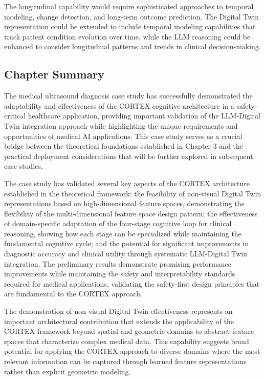 The longitudinal capability would require sophisticated approaches to temporal modeling, change detection, and long-term outcome prediction. The Digital Twin representation could be extended to include temporal modeling capabilities that track patient condition evolution over time, while the LLM reasoning could be enhanced to consider longitudinal patterns and trends in clinical decision-making.

\subsection{Chapter Summary}

The medical ultrasound diagnosis case study has successfully demonstrated the adaptability and effectiveness of the CORTEX cognitive architecture in a safety-critical healthcare application, providing important validation of the LLM-Digital Twin integration approach while highlighting the unique requirements and opportunities of medical AI applications. This case study serves as a crucial bridge between the theoretical foundations established in Chapter 3 and the practical deployment considerations that will be further explored in subsequent case studies.

The case study has validated several key aspects of the CORTEX architecture established in the theoretical framework: the feasibility of non-visual Digital Twin representations based on high-dimensional feature spaces, demonstrating the flexibility of the multi-dimensional feature space design pattern; the effectiveness of domain-specific adaptation of the four-stage cognitive loop for clinical reasoning, showing how each stage can be specialized while maintaining the fundamental cognitive cycle; and the potential for significant improvements in diagnostic accuracy and clinical utility through systematic LLM-Digital Twin integration. The preliminary results demonstrate promising performance improvements while maintaining the safety and interpretability standards required for medical applications, validating the safety-first design principles that are fundamental to the CORTEX approach.

The demonstration of non-visual Digital Twin effectiveness represents an important architectural contribution that extends the applicability of the CORTEX framework beyond spatial and geometric domains to abstract feature spaces that characterize complex medical data. This capability suggests broad potential for applying the CORTEX approach to diverse domains where the most relevant information can be captured through learned feature representations rather than explicit geometric modeling.

